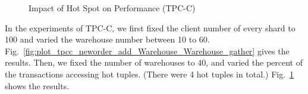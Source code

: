 \documentclass[conference]{IEEEtran}
\begin{document}
\begin{figure}[tbp]
  \centering
\caption{Impact of Hot Spot on Performance (TPC-C)}
\label{fig:plot_tpcc_neworder_add_HotItem_HotItem_gather}
\end{figure}

In the experiments of TPC-C, we first fixed the client number of every shard to 100 and varied the warehouse number between 10 to 60.
Fig.~\ref{fig:plot_tpcc_neworder_add_Warehouse_Warehouse_gather} gives the results.
Then, we fixed the number of warehouses to 40, and varied the percent of the transactions accessing hot tuples. (There were 4 hot tuples in total.)
Fig.~\ref{fig:plot_tpcc_neworder_add_HotItem_HotItem_gather} shows the results.
\end{document}
